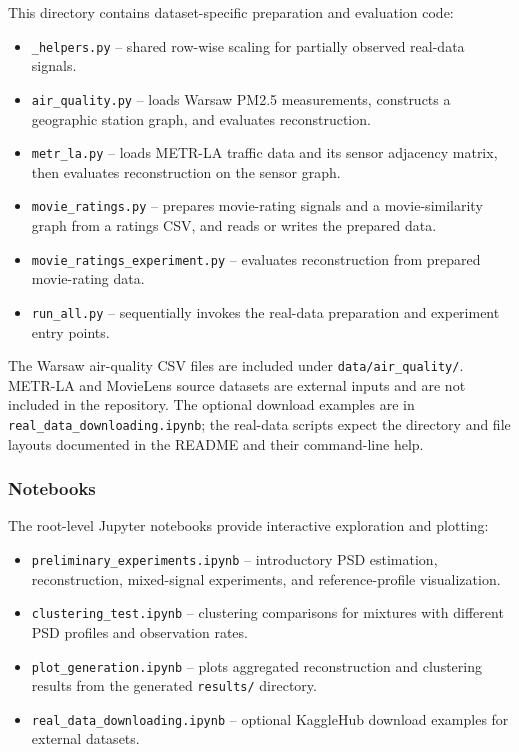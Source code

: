 This directory contains dataset-specific preparation and evaluation code:
\begin{itemize}
    \item \texttt{\_helpers.py} -- shared row-wise scaling for partially observed real-data signals.
    \item \texttt{air\_quality.py} -- loads Warsaw PM2.5 measurements, constructs a geographic station graph, and evaluates reconstruction.
    \item \texttt{metr\_la.py} -- loads METR-LA traffic data and its sensor adjacency matrix, then evaluates reconstruction on the sensor graph.
    \item \texttt{movie\_ratings.py} -- prepares movie-rating signals and a movie-similarity graph from a ratings CSV, and reads or writes the prepared data.
    \item \texttt{movie\_ratings\_experiment.py} -- evaluates reconstruction from prepared movie-rating data.
    \item \texttt{run\_all.py} -- sequentially invokes the real-data preparation and experiment entry points.
\end{itemize}

The Warsaw air-quality CSV files are included under \texttt{data/air\_quality/}. METR-LA and MovieLens source datasets are external inputs and are not included in the repository. The optional download examples are in \texttt{real\_data\_downloading.ipynb}; the real-data scripts expect the directory and file layouts documented in the README and their command-line help.

\subsubsection{Notebooks}

The root-level Jupyter notebooks provide interactive exploration and plotting:
\begin{itemize}
    \item \texttt{preliminary\_experiments.ipynb} -- introductory PSD estimation, reconstruction, mixed-signal experiments, and reference-profile visualization.
    \item \texttt{clustering\_test.ipynb} -- clustering comparisons for mixtures with different PSD profiles and observation rates.
    \item \texttt{plot\_generation.ipynb} -- plots aggregated reconstruction and clustering results from the generated \texttt{results/} directory.
    \item \texttt{real\_data\_downloading.ipynb} -- optional KaggleHub download examples for external datasets.
\end{itemize}

